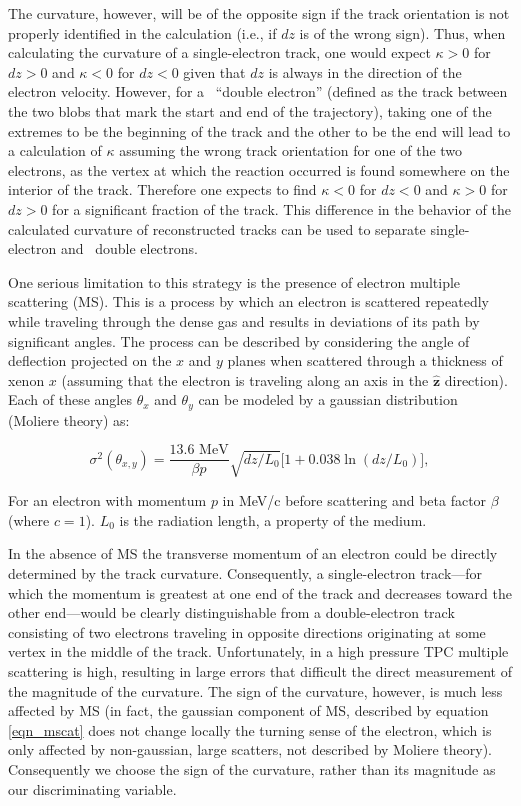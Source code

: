 \documentclass{JINST}
\begin{document}
The curvature, however, will be of the opposite sign if the track orientation is not properly identified in the calculation (i.e., if $dz$ is of the wrong sign).  Thus, when calculating the curvature of a single-electron track, one would expect $\kappa > 0$ for $dz > 0$ and $\kappa < 0$ for $dz < 0$ given that $dz$ is always in the direction of the electron velocity.  However, for a \bbonu\ ``double electron'' (defined as the track between the two blobs that mark the start and end of the trajectory), taking one of the extremes to be the beginning of the track and the other to be the end will lead to a calculation of $\kappa$ assuming the wrong track orientation for one of the two electrons, as the vertex at which the reaction occurred is found somewhere on the interior of the track.  Therefore one expects to find $\kappa < 0$ for $dz < 0$ and $\kappa > 0$ for $dz > 0$ for a significant fraction of the track.  This difference in the behavior of the calculated curvature of reconstructed tracks can be used to separate single-electron and \bbonu\ double electrons.

One serious limitation to this strategy is the presence of electron multiple scattering (MS). This is a process by which an electron is scattered repeatedly while traveling through the dense gas and results in deviations of its
path by significant angles. The process can be described by considering the angle of deflection projected on the $x$ and $y$ planes when scattered
through a thickness of xenon $x$ (assuming that the electron is traveling along an axis in the $\hat{\mathbf{z}}$ direction). Each of these angles $\theta_x$ and $\theta_y$ can be modeled by a gaussian 
distribution (Moliere theory) as:

\begin{equation}\label{eqn_mscat}
\sigma^{2}(\theta_{x,y}) = \frac{13.6\,\,\mathrm{MeV}}{\beta p}\sqrt{dz/L_{0}}\bigl[1 + 0.038\ln(dz/L_{0})\bigr],
\end{equation}

For an electron with momentum $p$ in MeV/c before scattering and beta factor $\beta$ (where $c = 1$).
$L_{0}$ is the radiation length, a property of the medium. 

In the absence of MS the transverse momentum of an electron could be directly determined by the track
curvature. Consequently, a single-electron track---for which the momentum is greatest at one end of the
track and decreases toward the other end---would be clearly distinguishable
from a double-electron track consisting of two electrons traveling in opposite directions originating at some vertex
in the middle of the track.  Unfortunately, in a high pressure TPC multiple scattering is high, resulting in large errors that difficult the direct measurement of the  magnitude of the curvature. The sign of the curvature, however, is much less affected by MS (in fact, the gaussian component of MS, described by equation \ref{eqn_mscat} does not change locally the turning sense of the electron, which is only affected by non-gaussian, large scatters, not described by Moliere theory). Consequently we choose the sign of the curvature, rather than its magnitude as our discriminating variable.  
\end{document}
